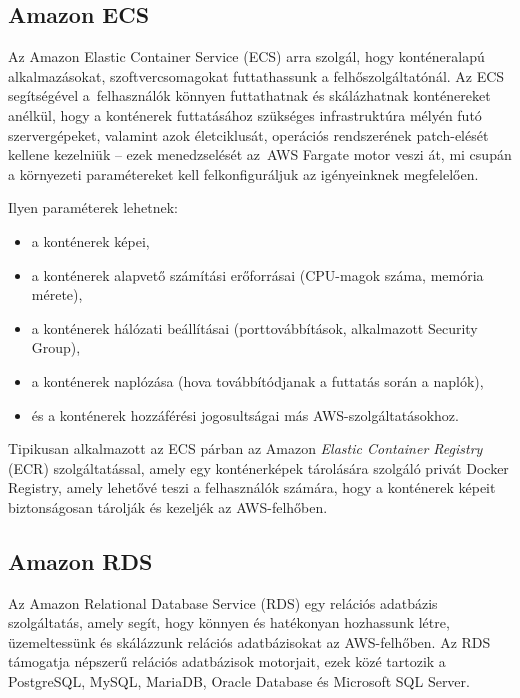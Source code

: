 \subsection{Amazon ECS}

Az Amazon Elastic Container Service (ECS) arra szolgál, hogy konténeralapú alkalmazásokat, szoftvercsomagokat futtathassunk a felhőszolgáltatónál. Az ECS segítségével a~felhasználók könnyen futtathatnak és skálázhatnak konténereket anélkül, hogy a konténerek futtatásához szükséges infrastruktúra mélyén futó szervergépeket, valamint azok életciklusát, operációs rendszerének patch-elését kellene kezelniük -- ezek menedzselését az~AWS Fargate motor veszi át, mi csupán a környezeti paramétereket kell felkonfiguráljuk az igényeinknek megfelelően.

Ilyen paraméterek lehetnek: 

\begin{itemize}
	\setlength{\itemsep}{1pt}
  \setlength{\parskip}{0pt}
  \setlength{\parsep}{0pt}
	\item a konténerek képei,
	\item a konténerek alapvető számítási erőforrásai (CPU-magok száma, memória mérete),
	\item a konténerek hálózati beállításai (porttovábbítások, alkalmazott Security Group),
	\item a konténerek naplózása (hova továbbítódjanak a futtatás során a naplók),
	\item és a konténerek hozzáférési jogosultságai más AWS-szolgáltatásokhoz.
\end{itemize}

Tipikusan alkalmazott az ECS párban az Amazon \emph{Elastic Container Registry} (ECR) szolgáltatással, amely egy konténerképek tárolására szolgáló privát Docker Registry, amely lehetővé teszi a felhasználók számára, hogy a konténerek képeit biztonságosan tárolják és kezeljék az AWS-felhőben.

\subsection{Amazon RDS}

Az Amazon Relational Database Service (RDS) egy relációs adatbázis szolgáltatás, amely segít, hogy könnyen és hatékonyan hozhassunk létre, üzemeltessünk és skálázzunk relációs adatbázisokat az AWS-felhőben. Az RDS támogatja népszerű relációs adatbázisok motorjait, ezek közé tartozik a PostgreSQL, MySQL, MariaDB, Oracle Database és Microsoft SQL Server.

